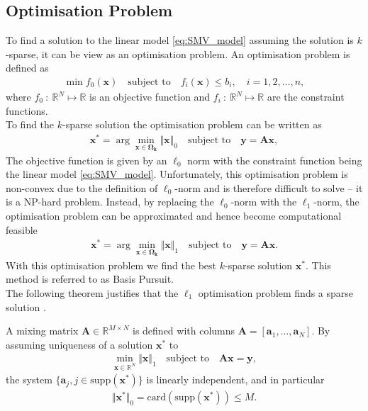 \subsection{Optimisation Problem}\label{sec:opti}
To find a solution to the linear model \eqref{eq:SMV_model} assuming the solution is $k$-sparse, it can be view as an optimisation problem. 
An optimisation problem is defined as
\begin{align*}
\min f_0 (\mathbf{x}) \quad \text{subject to} \quad f_i (\mathbf{x}) \leq b_i, \quad i = 1,2, \hdots, n ,
\end{align*}
where $f_0 \ : \ \mathbb{R}^N \mapsto \mathbb{R}$ is an objective function and $f_i \ : \ \mathbb{R}^N \mapsto \mathbb{R}$ are the constraint functions. 
\\
To find the $k$-sparse solution the optimisation problem can be written as
\begin{align*}
\mathbf{x}^\ast = \arg \min_{\mathbf{x} \in \boldsymbol{\Omega_{k}}} \Vert \mathbf{x} \Vert_0 \quad \text{subject to} \quad \mathbf{y} = \mathbf{Ax},
\end{align*}
The objective function is given by an $\ell_0$ norm with the constraint function being the linear model \eqref{eq:SMV_model}. 
Unfortunately, this optimisation problem is non-convex due to the definition of $\ell_0$-norm and is therefore difficult to solve -- it is a NP-hard problem. 
Instead, by replacing the $\ell_0$-norm with the $\ell_1$-norm, the optimisation problem can be approximated and hence become computational feasible \cite[p. 27]{CS}
\begin{align}\label{eq:SMV_p1}
\mathbf{x}^\ast = \arg \min_{\mathbf{x} \in  \boldsymbol{\Omega_{k}}} \Vert \mathbf{x} \Vert_1 \quad \text{subject to} \quad \mathbf{y} = \mathbf{Ax}.
\end{align} 
With this optimisation problem we find the best $k$-sparse solution $\mathbf{x}^\ast$. 
This method is referred to as Basis Pursuit. 
\\
The following theorem justifies that the $\ell_1$ optimisation problem finds a sparse solution \cite[p. 62-63]{FR}.
\begin{theorem}
A mixing matrix $\mathbf{A} \in \mathbb{R}^{M \times N}$ is defined with columns $\mathbf{A} = [\mathbf{a}_1, \dots, \mathbf{a}_N]$. 
By assuming uniqueness of a solution $\mathbf{x}^{\ast}$ to
\begin{align*}
\min_{\mathbf{x} \in \mathbb{R}^N} \Vert \mathbf{x} \Vert_1 \quad \text{subject to} \quad \mathbf{Ax} = \mathbf{y},
\end{align*}
the system $\lbrace \mathbf{a}_j, j \in \text{supp}( \mathbf{x}^\ast) \rbrace$ is linearly independent, and in particular
\begin{align*}
\Vert \mathbf{x}^\ast \Vert_0 = \text{card}(\text{supp} (\mathbf{x}^\ast)) \leq M.
\end{align*}
\end{theorem}
